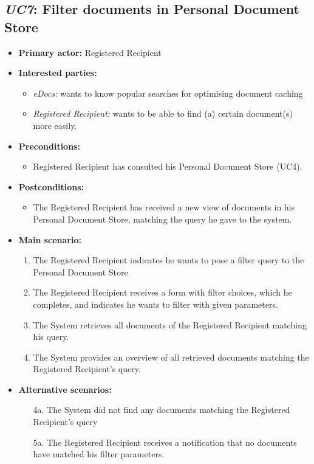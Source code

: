 \documentclass[a4paper,10pt]{article}
\begin{document}
\subsection{\emph{UC7}: Filter documents in Personal Document Store}
\begin{itemize}
    \item \textbf{Primary actor:} Registered Recipient
    \item \textbf{Interested parties:} 
        \begin{itemize}
            \item \textit{eDocs:} wants to know popular searches for optimising document caching
            \item \textit{Registered Recipient:} wants to be able to find (a) certain document(s) more easily.
        \end{itemize}

    \item \textbf{Preconditions:}
        \begin{itemize}
            \item Registered Recipient has consulted his Personal Document Store (UC4).
        \end{itemize}

    \item \textbf{Postconditions:}
        \begin{itemize}
            \item The Registered Recipient has received a new view of documents in his Personal Document Store, matching the query he gave to the system.
        \end{itemize}
        
    \item \textbf{Main scenario:} 
    \begin{enumerate}
       \item The Registered Recipient indicates he wants to pose a filter query to the Personal Document Store
       \item The Registered Recipient receives a form with filter choices, which he completes, and indicates he wants to filter with given parameters.
       \item The System retrieves all documents of the Registered Recipient matching his query.
       \item The System provides an overview of all retrieved documents matching the Registered Recipient's query.
    \end{enumerate}

    \item \textbf{Alternative scenarios:} 
    \begin{enumerate}
        \item [4a.] The System did not find any documents matching the Registered Recipient's query
        \item [5a.] The Registered Recipient receives a notification that no documents have matched his filter parameters.
    \end{enumerate}
    

\end{itemize}
\end{document}
